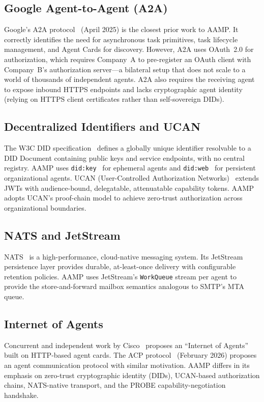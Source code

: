\documentclass[11pt,a4paper]{article}
\begin{document}
\subsection{Google Agent-to-Agent (A2A)}

Google's A2A protocol~\cite{googlea2a2025} (April 2025) is the closest prior work to
AAMP. It correctly identifies the need for asynchronous task primitives, task lifecycle
management, and Agent Cards for discovery. However, A2A uses OAuth~2.0 for
authorization, which requires Company~A to pre-register an OAuth client with Company~B's
authorization server---a bilateral setup that does not scale to a world of thousands
of independent agents. A2A also requires the receiving agent to expose inbound HTTPS
endpoints and lacks cryptographic agent identity (relying on HTTPS client certificates
rather than self-sovereign DIDs).

\subsection{Decentralized Identifiers and UCAN}

The W3C DID specification~\cite{w3cdid2022} defines a globally unique identifier
resolvable to a DID Document containing public keys and service endpoints, with no
central registry. AAMP uses \texttt{did:key}~\cite{didkey} for ephemeral agents and
\texttt{did:web}~\cite{didweb} for persistent organizational agents. UCAN (User-Controlled
Authorization Networks)~\cite{ucan2022} extends JWTs with audience-bound, delegatable,
attenuatable capability tokens. AAMP adopts UCAN's proof-chain model to achieve
zero-trust authorization across organizational boundaries.

\subsection{NATS and JetStream}

NATS~\cite{nats2024} is a high-performance, cloud-native messaging system. Its
JetStream persistence layer provides durable, at-least-once delivery with configurable
retention policies. AAMP uses JetStream's \texttt{WorkQueue} stream per agent to
provide the store-and-forward mailbox semantics analogous to SMTP's MTA queue.

\subsection{Internet of Agents}

Concurrent and independent work by Cisco~\cite{chen2024internetofagents} proposes an
``Internet of Agents'' built on HTTP-based agent cards. The ACP protocol~\cite{acp2026}
(February 2026) proposes an agent communication protocol with similar motivation.
AAMP differs in its emphasis on zero-trust cryptographic identity (DIDs), UCAN-based
authorization chains, NATS-native transport, and the PROBE capability-negotiation
handshake.
\end{document}
